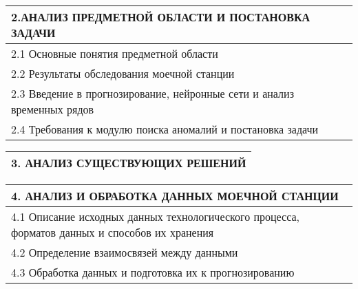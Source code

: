 \documentclass[12pt, А4, twoside]{article} %
\begin{document}
\begin{flushleft}
		\begin{tabular}{p{17.25cm}}
			\textsf{2.АНАЛИЗ ПРЕДМЕТНОЙ ОБЛАСТИ И ПОСТАНОВКА ЗАДАЧИ} \vspace{1pt}\\ \hline 
			\hspace{0.3cm}\textsf{2.1 Основные понятия предметной области} \vspace{1pt}\\ \hline 
			\hspace{0.3cm}\textsf{2.2 Результаты обследования моечной станции} \vspace{1pt}\\ \hline 
			\hspace{0.3cm}\textsf{2.3 Введение в прогнозирование, нейронные сети и анализ временных рядов} \vspace{1pt}\\ \hline 
			\hspace{0.3cm}\textsf{2.4 Требования к модулю поиска аномалий и постановка задачи} \vspace{1pt}\\ \hline 
		\end{tabular}  
		
		\begin{tabular}{p{17.25cm}} 
			\textsf{3. АНАЛИЗ СУЩЕСТВУЮЩИХ РЕШЕНИЙ} \vspace{1pt}\\ \hline 
		\end{tabular} 
		
		\begin{tabular}{p{17.25cm}} 
			\textsf{4. АНАЛИЗ И ОБРАБОТКА ДАННЫХ МОЕЧНОЙ СТАНЦИИ} \vspace{1pt}\\ \hline 
			\hspace{0.3cm}\textsf{4.1 Описание исходных данных технологического процесса, форматов данных и способов их хранения} \vspace{1pt}\\ \hline 
			\hspace{0.3cm}\textsf{4.2 Определение взаимосвязей между данными } \vspace{1pt}\\ \hline 
			\hspace{0.3cm}\textsf{4.3 Обработка данных и подготовка их к прогнозированию} \vspace{1pt}\\ \hline 
		\end{tabular}    
		

\end{flushleft}
\end{document}
